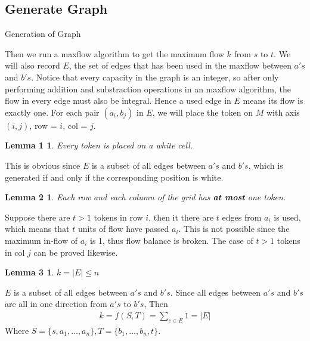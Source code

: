 \documentclass{report}
\begin{document}
    \subsection*{Generate Graph}
    \begin{algorithm}
        \caption{Generation of Graph}
        \begin{algorithmic}[1]
            \EndFor{}
                    \EndIf{}
                \EndFor{}
            \EndFor{}
        \end{algorithmic}
    \end{algorithm}
    Then we run a maxflow algorithm to get the maximum flow $k$ from $s$ to $t$. 
    We will also record $E$, the set of edges that has been used in the maxflow between 
    $a's$ and $b's$. Notice that every capacity in the graph is an integer, so after only 
    performing addition and substraction operations in an maxflow algorithm, the flow in every
    edge must also be integral. Hence a used edge in $E$ means its flow is exactly one. 
    For each pair $(a_i, b_j)$ in $E$, we will place the token on $M$ 
    with axis $(i, j)$, row = $i$, col = $j$. 
    \newtheorem*{l1}{Lemma 1}
    \begin{l1}
        Every token is placed on a white cell.
    \end{l1}
    This is obvious since $E$ is a subset of all edges between $a's$ and $b's$, which 
    is generated if and only if the corresponding position is white.
    \newtheorem*{l2}{Lemma 2}
    \begin{l2}
        Each row and each column of the grid has \textbf{at most} one token.
    \end{l2}
    Suppose there are $t>1$ tokens in row $i$, then it there are $t$ edges from
    $a_i$ is used, which means that $t$ units of flow have passed $a_i$. This is not 
    possible since the maximum in-flow of $a_i$ is 1, thus flow balance is broken.
    The case of $t>1$ tokens in col $j$ can be proved likewise. 
    \newtheorem*{l3}{Lemma 3}
    \begin{l3}
        $k = |E| \le n$
    \end{l3}
    $E$ is a subset of all edges between $a's$ and $b's$. Since all edges between $a's$ 
    and $b's$ are all in one direction from $a's$ to $b's$, Then 
    \begin{align*}
        k = f(S, T) = \sum_{e \in E} 1 = |E|
    \end{align*}
    Where $S = \{s, a_1, \ldots, a_n\}, T = \{b_1, \ldots, b_n, t\}$.
\end{document}
